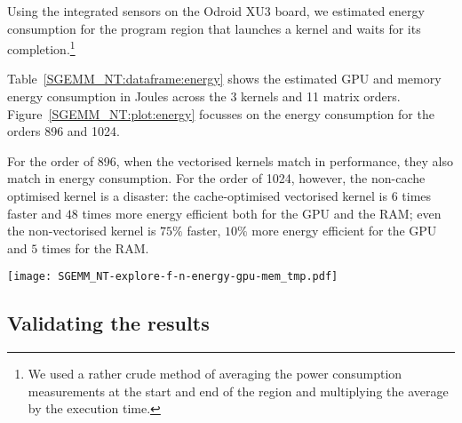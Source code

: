 \documentclass{acm_proc_article-sp} %
\begin{document}
Using the integrated sensors on the Odroid XU3 board, we estimated energy
consumption for the program region that launches a kernel and waits for its
completion.\footnote{We used a rather crude method of averaging the power
consumption measurements at the start and end of the region and multiplying the
average by the execution time.}

Table~\ref{SGEMM_NT:dataframe:energy} shows the estimated GPU and memory energy
consumption in Joules across the 3 kernels and 11 matrix orders.
%
Figure~\ref{SGEMM_NT:plot:energy} focusses on the energy consumption for the
orders 896 and 1024.

For the order of 896, when the vectorised kernels match in performance, they
also match in energy consumption.
%
For the order of 1024, however, the non-cache optimised kernel is a disaster:
%
the cache-optimised vectorised kernel is $6$ times faster and $48$ times more
energy efficient both for the GPU and the RAM;
%
even the non-vectorised kernel is $75\%$ faster, $10\%$ more energy efficient
for the GPU and $5$ times for the RAM.

\begin{table*}
\centering
\caption{\label{SGEMM_NT:dataframe:energy}The GPU \& memory energy consumption of 3 SGEMM NT kernels: {\tt pandas} DataFrame with raw results.}

\end{table*}

\begin{figure*}
\texttt{[image: SGEMM\_NT-explore-f-n-energy-gpu-mem\_tmp.pdf]}
\caption{The GPU \& memory energy consumption of 3 SGEMM NT kernels: {\tt matplotlib} bar plot.}
\label{SGEMM_NT:plot:energy}
\end{figure*}



\subsection{Validating the results}



%

\end{document}
